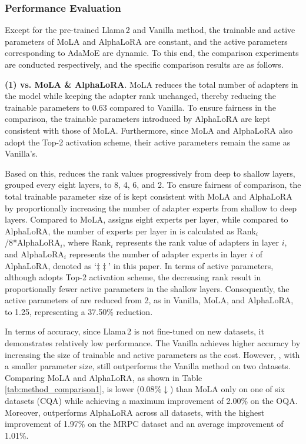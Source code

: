 \subsubsection{Performance Evaluation}
Except for the pre-trained Llama\,2 and Vanilla method, the trainable and active parameters of MoLA and AlphaLoRA are constant, and the active parameters corresponding to AdaMoE are dynamic. To this end, the comparison experiments are conducted respectively, and the specific comparison results are as follows. 

\textbf{(1) \name vs. MoLA \& AlphaLoRA}. MoLA reduces the total number of adapters in the model while keeping the adapter rank unchanged, thereby reducing the trainable parameters to 0.63 compared to Vanilla. To ensure fairness in the comparison, the trainable parameters introduced by AlphaLoRA are kept consistent with those of MoLA. Furthermore, since MoLA and AlphaLoRA also adopt the Top-2 activation scheme, their active parameters remain the same as Vanilla's.

Based on this, \name reduces the rank values progressively from deep to shallow layers, grouped every eight layers, to 8, 4, 6, and 2. To ensure fairness of comparison, the total trainable parameter size of \name is kept consistent with MoLA and AlphaLoRA by proportionally increasing the number of adapter experts from shallow to deep layers. Compared to MoLA, \name assigns eight experts per layer, while compared to AlphaLoRA, the number of experts per layer in \name is calculated as Rank$_i$/8*AlphaLoRA$_i$, where Rank$_i$ represents the rank value of adapters in layer $i$, and AlphaLoRA$_i$ represents the number of adapter experts in layer $i$ of AlphaLoRA, denoted as `$\ddagger\ddagger$' in this paper. In terms of active parameters, although \name adopts Top-2 activation scheme, the decreasing rank result in proportionally fewer active parameters in the shallow layers. Consequently, the active parameters of \name are reduced from 2, as in Vanilla, MoLA, and AlphaLoRA, to 1.25, representing a 37.50\% reduction. 

In terms of accuracy, since Llama\,2 is not fine-tuned on new datasets, it demonstrates relatively low performance. The Vanilla achieves higher accuracy by increasing the size of trainable and active parameters as the cost. However, \name, with a smaller parameter size, still outperforms the Vanilla method on two datasets. Comparing MoLA and AlphaLoRA, as shown in Table \ref{tab:method_comparison1}, \name is lower (0.08\%$\downarrow$) than MoLA only on one of six datasets (CQA) while achieving a maximum improvement of 2.00\% on the OQA. Moreover, \name outperforms AlphaLoRA across all datasets, with the highest improvement of 1.97\% on the MRPC dataset and an average improvement of 1.01\%.

